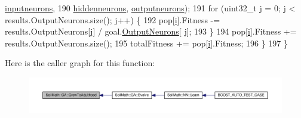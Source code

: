 \begin{DoxyCode}
      \hyperlink{class_soil_math_1_1_g_a_ac32591e30dde5ac854ae57a7b9e33298}{inputneurons},
190                                   \hyperlink{class_soil_math_1_1_g_a_a3f1eee7492f68a05b9b06ee8afb2ec20}{hiddenneurons}, \hyperlink{class_soil_math_1_1_g_a_ab454f9968d5ce2a294b89f85c9d3a74f}{outputneurons});
191     \textcolor{keywordflow}{for} (uint32\_t \hyperlink{_comparision_pictures_2_createtest_image_8m_ac86694252f8dfdb19aaeadc4b7c342c6}{j} = 0; \hyperlink{_comparision_pictures_2_createtest_image_8m_ac86694252f8dfdb19aaeadc4b7c342c6}{j} < results.OutputNeurons.size(); \hyperlink{_comparision_pictures_2_createtest_image_8m_ac86694252f8dfdb19aaeadc4b7c342c6}{j}++) \{
192       pop[\hyperlink{_comparision_pictures_2_createtest_image_8m_a6f6ccfcf58b31cb6412107d9d5281426}{i}].Fitness -= results.OutputNeurons[\hyperlink{_comparision_pictures_2_createtest_image_8m_ac86694252f8dfdb19aaeadc4b7c342c6}{j}] / goal.\hyperlink{struct_predict__struct_aa0708cae93baa061f21452537e86d3bd}{OutputNeurons}[
      \hyperlink{_comparision_pictures_2_createtest_image_8m_ac86694252f8dfdb19aaeadc4b7c342c6}{j}];
193     \}
194     pop[\hyperlink{_comparision_pictures_2_createtest_image_8m_a6f6ccfcf58b31cb6412107d9d5281426}{i}].Fitness += results.OutputNeurons.size();
195     totalFitness += pop[\hyperlink{_comparision_pictures_2_createtest_image_8m_a6f6ccfcf58b31cb6412107d9d5281426}{i}].Fitness;
196   \}
197 \}
\end{DoxyCode}


Here is the caller graph for this function\+:\nopagebreak
\begin{figure}[H]
\begin{center}
\leavevmode
\includegraphics[width=350pt]{class_soil_math_1_1_g_a_aff791f50f889beb74e854942f8883b58_icgraph}
\end{center}
\end{figure}


\hypertarget{class_soil_math_1_1_g_a_aa39c76b7958bfc80b713389a6f0c6b97}{}
